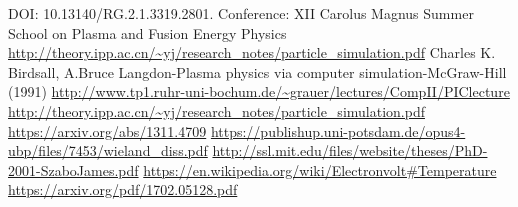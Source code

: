 \documentclass{article}
\begin{document}
\medskip
 
\begin{thebibliography}{7}
DOI: 10.13140/RG.2.1.3319.2801. Conference: XII Carolus Magnus Summer School on Plasma and Fusion Energy Physics
\url{http://theory.ipp.ac.cn/~yj/research_notes/particle_simulation.pdf}
Charles K. Birdsall, A.Bruce Langdon-Plasma physics via computer simulation-McGraw-Hill (1991)
\url{http://www.tp1.ruhr-uni-bochum.de/~grauer/lectures/CompII/PIClecture}
\url{http://theory.ipp.ac.cn/~yj/research_notes/particle_simulation.pdf}
\url{https://arxiv.org/abs/1311.4709}
\url{https://publishup.uni-potsdam.de/opus4-ubp/files/7453/wieland_diss.pdf}
\url{http://ssl.mit.edu/files/website/theses/PhD-2001-SzaboJames.pdf}
\url{https://en.wikipedia.org/wiki/Electronvolt#Temperature}
\url{https://arxiv.org/pdf/1702.05128.pdf}
\end{thebibliography}
\end{document}
